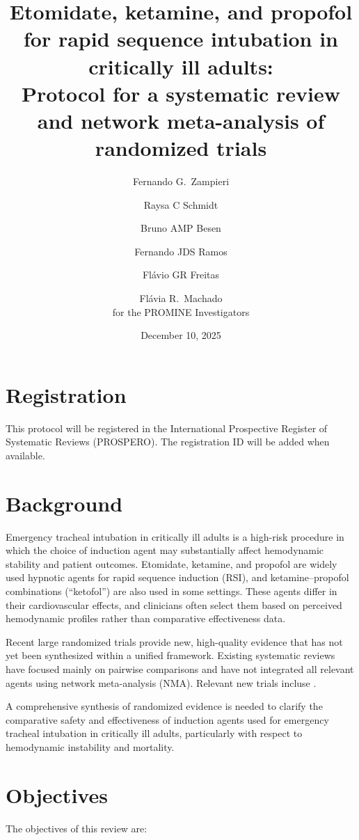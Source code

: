 \documentclass[11pt]{article}
\title{Etomidate, ketamine, and propofol for rapid sequence intubation in critically ill adults:\\
Protocol for a systematic review and network meta-analysis of randomized trials}
\author{Fernando G.\ Zampieri \and Raysa C Schmidt \and Bruno AMP Besen \and Fernando JDS Ramos \and Fl\'avio GR Freitas \and Fl\'avia R.\ Machado\\[4pt]
\textnormal{for the PROMINE Investigators}}
\date{December 10, 2025}
\begin{document}
\maketitle

\section*{Registration}

This protocol will be registered in the International Prospective Register of Systematic Reviews (PROSPERO). The registration ID will be added when available.

\section{Background}

Emergency tracheal intubation in critically ill adults is a high-risk procedure in which the choice of induction agent may substantially affect hemodynamic stability and patient outcomes. Etomidate, ketamine, and propofol are widely used hypnotic agents for rapid sequence induction (RSI), and ketamine--propofol combinations (``ketofol'') are also used in some settings. These agents differ in their cardiovascular effects, and clinicians often select them based on perceived hemodynamic profiles rather than comparative effectiveness data.

Recent large randomized trials provide new, high-quality evidence that has not yet been synthesized within a unified framework. Existing systematic reviews have focused mainly on pairwise comparisons and have not integrated all relevant agents using network meta-analysis (NMA). Relevant new trials incluse \cite{PROMINE2025,RSI2025}.

A comprehensive synthesis of randomized evidence is needed to clarify the comparative safety and effectiveness of induction agents used for emergency tracheal intubation in critically ill adults, particularly with respect to hemodynamic instability and mortality.

\section{Objectives}

The objectives of this review are:
\end{document}

